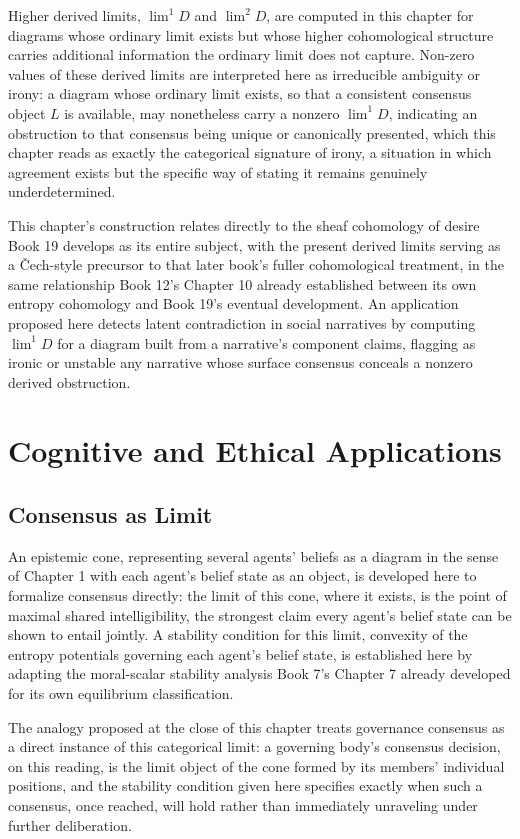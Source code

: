 Higher derived limits, $\lim^1 D$ and $\lim^2 D$, are computed in this chapter for diagrams whose ordinary limit exists but whose higher cohomological structure carries additional information the ordinary limit does not capture. Non-zero values of these derived limits are interpreted here as irreducible ambiguity or irony: a diagram whose ordinary limit exists, so that a consistent consensus object $L$ is available, may nonetheless carry a nonzero $\lim^1 D$, indicating an obstruction to that consensus being unique or canonically presented, which this chapter reads as exactly the categorical signature of irony, a situation in which agreement exists but the specific way of stating it remains genuinely underdetermined.

This chapter's construction relates directly to the sheaf cohomology of desire Book 19 develops as its entire subject, with the present derived limits serving as a Čech-style precursor to that later book's fuller cohomological treatment, in the same relationship Book 12's Chapter 10 already established between its own entropy cohomology and Book 19's eventual development. An application proposed here detects latent contradiction in social narratives by computing $\lim^1 D$ for a diagram built from a narrative's component claims, flagging as ironic or unstable any narrative whose surface consensus conceals a nonzero derived obstruction.

\part{Cognitive and Ethical Applications}

\chapter{Consensus as Limit}

An epistemic cone, representing several agents' beliefs as a diagram in the sense of Chapter 1 with each agent's belief state as an object, is developed here to formalize consensus directly: the limit of this cone, where it exists, is the point of maximal shared intelligibility, the strongest claim every agent's belief state can be shown to entail jointly. A stability condition for this limit, convexity of the entropy potentials governing each agent's belief state, is established here by adapting the moral-scalar stability analysis Book 7's Chapter 7 already developed for its own equilibrium classification.

The analogy proposed at the close of this chapter treats governance consensus as a direct instance of this categorical limit: a governing body's consensus decision, on this reading, is the limit object of the cone formed by its members' individual positions, and the stability condition given here specifies exactly when such a consensus, once reached, will hold rather than immediately unraveling under further deliberation.

